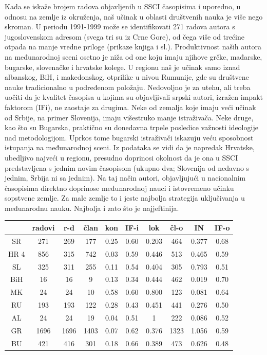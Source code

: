 \documentclass[12pt,a4paper]{article}
\begin{document}
  Kada se iskaže brojem radova objavljenih u SSCI časopisima i uporedno, u odnosu na zemlje iz okruženja, naš učinak u oblasti društvenih nauka je više nego skroman. U periodu 1991-1999 može se identifikovati 271 radova autora s jugoslovenskom adresom (svega tri su iz Crne Gore), od čega više od trećine otpada na manje vredne priloge (prikaze knjiga i sl.). Produktivnost naših autora na međunarodnoj sceni osetno je niža od one koju imaju njihove grčke, mađarske, bugarske, slovenačke i hrvatske kolege. U regionu naš je učinak samo iznad albanskog, BiH, i makedonskog, otprilike u nivou Rumunije, gde su društvene nauke tradicionalno u podređenom položaju. Nedovoljno je za utehu, ali treba uočiti da je kvalitet časopisa u kojima su objavljivali srpski autori, izražen impakt faktorom (IFi), ne zaostaje za drugima. Neke od zemalja koje imaju veći učinak od Srbije, na primer Slovenija, imaju višestruko manje istraživača. Neke druge, kao što su Bugarska, praktično su donedavna trpele posledice važnosti ideologije nad metodologijom. Uprkos tome bugarski istraživači iskazuju veću sposobnost istupanja na međunarodnoj sceni. Iz podataka se vidi da je napredak Hrvatske, ubedljivo najveći u regionu, presudno doprinosi okolnost da je ona u SSCI predstavljena s jednim novim časopisom (ukupno dva; Slovenija od nedavno s jednim, Srbija ni sa jednim). Na taj način autori, objavljujući u nacionalnim časopisima direktno doprinose međunarodnoj nauci i istovremeno učinku sopstvene zemlje. Za male zemlje to i jeste najbolja strategija uključivanja u međunarodnu nauku. Najbolja i zato što je najjeftinija.

    \qquad

   \begin{tabular}{|c|c|c|c|c|c|c|c|c|c|}
  \hline
    & radovi & r-d & član & kon & IF-i & lok & čl-o & IN & IF-o\\
  \hline
  SR & 271 & 269 & 177 & 0.25 & 0.60 & 0.203 & 464 & 0.377 & 0.68\\
  \hline
  HR 4 & 856 & 315 & 742 & 0.03 & 0.59 & 0.446 & 513 & 0.465 & 0.59\\
  \hline
  SL & 325 & 311 & 255 & 0.11 &0.54 & 0.404 & 305 & 0.793 & 0.51\\
  \hline
  BiH & 16 & 16 & 9 & 0.13 & 0.34 & 0.444 & 462 & 0.019 & 0.70\\
  \hline
  MK & 24 & 24 & 10 & 0.58 & 0.60 & 0.800 & 123 & 0.081 & 0.64\\
  \hline
  RU & 193 & 193 & 122 & 0.28 & 0.43 & 0.451 & 441 & 0.276 & 0.50\\
  \hline
  AL & 24 & 24 & 19 & 0.04 & 0.51 & 1 & 222 & 0.086 & 0.52\\
  \hline
  GR & 1696 & 1696 & 1403 & 0.07 & 0.62 & 0.376 & 1323 & 1.056 & 0.59\\
  \hline
  BU & 421 & 416 & 301 & 0.18 & 0.66 & 0.389 & 473 & 0.626 & 0.48\\
  \hline

    
  \hline
  
\end{tabular}
\end{document}
